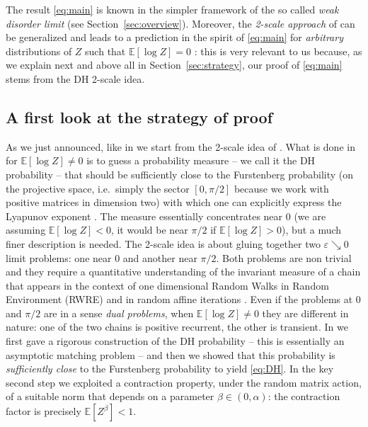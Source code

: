 \documentclass[reqno,11pt]{amsart}
\numberwithin{equation}{section}
\newcommand{\bbE}{{\ensuremath{\mathbb E}} }
\newcommand{\ga}{\alpha}
\newcommand{\gb}{\beta}
\newcommand{\gep}{\varepsilon}       %
\begin{document}
 
 
 The result  \eqref{eq:main} is  known in the simpler framework of the so called  \emph{weak disorder limit} (see Section~\ref{sec:overview}). 
 Moreover, the \emph{2-scale approach} of \cite{cf:DH} can be generalized and leads to a prediction  in the spirit  of \eqref{eq:main} for \emph{arbitrary} distributions of $Z$ such that $\bbE[\log Z]=0$  \cite{cf:Derrida-private}: this is very relevant to us because, as we explain next and above all in Section~\ref{sec:strategy}, 
 our proof of  \eqref{eq:main} stems from 
 the DH 2-scale idea. 
 
 
 
 \subsection{A first look at the strategy of proof}
 \label{sec:firstlook}

 As we just announced, like  in   \cite{cf:GGG} we  start from  the 2-scale idea of \cite{cf:DH}. What is done in \cite{cf:DH} for $\bbE[\log Z] \neq 0$ is to guess a probability measure -- we call it the DH probability -- that should be sufficiently close to the Furstenberg probability (on the projective space, i.e.\ simply the sector  $[0, \pi/2]$ because we work with positive matrices in dimension two) with which one can explicitly express the Lyapunov exponent \cite{cf:BL}. The measure essentially concentrates near $0$ (we are assuming $\bbE[\log Z] < 0$, it would be near $\pi/2$ if $\bbE[\log Z] > 0$), but a much finer description is needed. The 2-scale idea is about gluing together   two $\gep \searrow 0$ limit problems: one  near $0$ and another  near $\pi/2$. Both problems are non trivial and they require a quantitative understanding of the invariant measure of 
a chain that appears in  the context of one dimensional  Random Walks in Random Environment (RWRE) \cite{cf:decalanetal,cf:kozlov,cf:KKS}  and in  random affine iterations \cite{cf:BDMbook}. Even if the problems at $0$ and $\pi/2$ are in a sense \emph{dual problems}, when $\bbE[\log Z]\neq 0$ they are  different in nature: 
one of the two chains is positive recurrent, the other is transient.
  In \cite{cf:GGG} we first gave a rigorous construction of the  DH probability -- this is essentially an asymptotic matching problem --
    and then we showed that this probability is \emph{sufficiently close} to the Furstenberg probability to yield 
    \eqref{eq:DH}. 
In  the key second step we exploited a contraction property, under the random matrix action, of a suitable norm that depends on a parameter $\gb\in (0,\ga)$:
the contraction factor is precisely $\bbE[Z^\gb]<1$. 
\medskip
\end{document}

